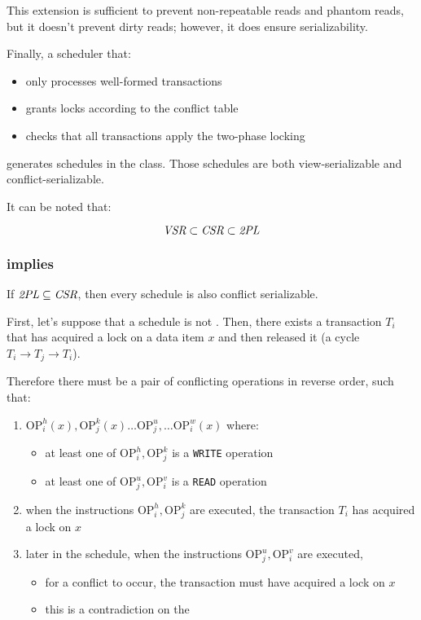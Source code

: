 \documentclass[english]{article}
\begin{document}
This extension is sufficient to prevent non-repeatable reads and phantom reads, but it doesn't prevent dirty reads;
however, it does ensure serializability.

\bigskip
Finally, a scheduler that:

\begin{itemize}
  \item only processes well-formed transactions
  \item grants locks according to the conflict table
  \item checks that all transactions apply the two-phase locking
\end{itemize}

generates schedules in the \TPL class.
Those schedules are both view-serializable and conflict-serializable.

It can be noted that:

\[ \textit{VSR} \subset \textit{CSR} \subset \textit{2PL} \]

\subsubsection{\TPL implies \CSR}

If \(\textit{2PL} \subseteq \textit{CSR}\), then every \TPL schedule is also conflict serializable.

\bigskip
First, let's suppose that a \TPL schedule is not \CSR.
Then, there exists a transaction \(T_i\) that has acquired a lock on a data item \(x\) and then released it (a cycle \(T_i \rightarrow T_j \rightarrow T_i\)).

Therefore there must be a pair of conflicting operations in reverse order, such that:

\begin{enumerate}
  \item \(\text{OP}_{i}^{h}(x), \text{OP}_{j}^{k}(x) \ldots \text{OP}_{j}^{u}, \ldots \text{OP}_{i}^{w}(x)\) where:
        \begin{itemize}
          \item at least one of \(\text{OP}_{i}^{h}, \text{OP}_{j}^{k}\) is a \texttt{WRITE} operation
          \item at least one of \(\text{OP}_{j}^{u}, \text{OP}_{i}^{v}\) is a \texttt{READ} operation
        \end{itemize}
  \item when the instructions \(\text{OP}_{i}^{h}, \text{OP}_{j}^{k}\) are executed, the transaction \(T_i\) has acquired a lock on \(x\)
  \item later in the schedule, when the instructions \(\text{OP}_{j}^{u}, \text{OP}_{i}^{v}\) are executed,
        \begin{itemize}
          \item for a conflict to occur, the transaction must have acquired a lock on \(x\)
          \item this is a contradiction on the \TPL
        \end{itemize}
\end{enumerate}
\end{document}
